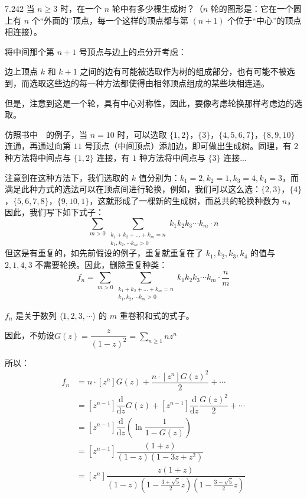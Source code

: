 \begin{problem}{7.24}{2}
  当 \( n \geqslant 3 \) 时，在一个 \( n \) 轮中有多少棵生成树？（\( n \) 轮的图形是：它在一个圆上有 \( n \) 个“外面的”顶点，每一个这样的顶点都与第 \( (n+1) \) 个位于“中心”的顶点相连接）。
\end{problem}

将中间那个第 \( n+1 \) 号顶点与边上的点分开考虑：

边上顶点 \( k \) 和 \( k+1 \) 之间的边有可能被选取作为树的组成部分，也有可能不被选到，而选取这些边的每一种方法都使得由相邻顶点组成的某些块相连通。

但是，注意到这是一个轮，具有中心对称性，因此，要像考虑轮换那样考虑边的选取。

仿照书中~\cite{graham1994concrete}~的例子，当 \( n=10 \) 时，可以选取 \( \{ 1, 2 \} \)，\( \{ 3 \} \)，\( \{ 4, 5, 6, 7 \} \)，\( \{ 8, 9, 10 \} \) 连通，再通过向第 \( 11 \) 号顶点（中间顶点）添加边，即可做出生成树。同理，有 \( 2 \) 种方法将中间点与 \( \{ 1, 2 \} \) 连接，有 \( 1 \) 种方法将中间点与 \( \{ 3 \} \) 连接...

注意到在这种方法下，我们选取的 \( k \) 值分别为：\( k_1 = 2, k_2 = 1, k_3 = 4, k_4 = 3 \)，而满足此种方式的选法可以在顶点间进行轮换，例如，我们可以这么选：\( \{ 2, 3 \} \)，\( \{ 4 \} \)，\( \{ 5, 6, 7, 8 \} \)，\( \{ 9, 10, 1 \} \)，这就形成了一棵新的生成树，而总共的轮换种数为 \( n \)，因此，我们写下如下式子：
\[
  \sum_{m > 0} \sum_{\substack{k_1 + k_2 + \dots + k_m = n \\
  k_1, k_2, \cdots k_m > 0}} k_1 k_2 k_3 \cdots k_m \cdot n
\]
但这是有重复的，如先前假设的例子，重复就重复在了 \( k_1, k_2, k_3, k_4 \) 的值与 \( 2, 1, 4, 3 \) 不需要轮换。因此，删除重复种类：
\[
  f_n = \sum_{m > 0} \sum_{\substack{k_1 + k_2 + \dots + k_m = n \\
  k_1, k_2, \cdots k_m > 0}} k_1 k_2 k_3 \cdots k_m \cdot \dfrac{n}{m}
\]

\( f_n \) 是关于数列 \( \langle 1, 2, 3, \cdots \rangle \) 的 \( m \) 重卷积和式的式子。

因此，不妨设\( G(z) = \dfrac{z}{(1-z)^2} = \sum_{n \geqslant 1} n z^n \)

所以：
\begin{align*}
  f_n &= n \cdot [z^n] G(z) + \dfrac{n \cdot [z^n]G(z)^2}{2} + \cdots \\
  &= [z^{n-1}] \dfrac{\mathrm{d}}{\mathrm{d}z} G(z) + [z^{n-1}] \dfrac{\mathrm{d}}{\mathrm{d}z} \dfrac{G(z)^2}{2} + \cdots \\
  &= [z^{n-1}] \dfrac{\mathrm{d}}{\mathrm{d}z} \left( \ln{\dfrac{1}{1-G(z)}} \right) \\
  &= [z^{n-1}] \dfrac{(1+z)}{(1-z)(1-3z+z^2)} \\
  &= [z^n] \dfrac{z(1+z)}{(1-z) (1-\frac{3+\sqrt{5}}{2}z) (1-\frac{3-\sqrt{5}}{2}z)} \\
\end{align*}

